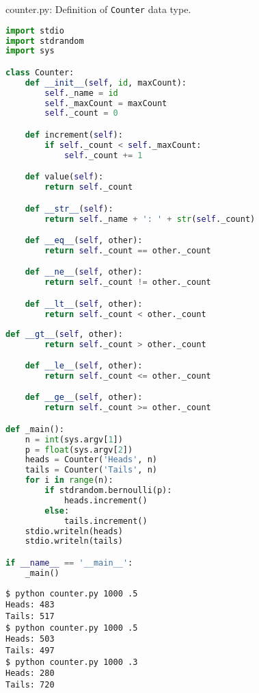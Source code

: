 \documentclass[8pt,a4paper,compress]{beamer}
\begin{document}
\begin{frame}[fragile]
\pause

\begin{framed}
\tiny counter.py: Definition of \lstinline{Counter} data type.
\end{framed}

\begin{lstlisting}[language=Python]
import stdio
import stdrandom
import sys

class Counter:
    def __init__(self, id, maxCount):
        self._name = id
        self._maxCount = maxCount
        self._count = 0

    def increment(self):
        if self._count < self._maxCount:
            self._count += 1

    def value(self):
        return self._count

    def __str__(self):
        return self._name + ': ' + str(self._count)

    def __eq__(self, other):
        return self._count == other._count

    def __ne__(self, other):
        return self._count != other._count

    def __lt__(self, other):
        return self._count < other._count
\end{lstlisting}
\end{frame}

\begin{frame}[fragile]
\pause

\begin{lstlisting}[language=Python]
    def __gt__(self, other):
        return self._count > other._count

    def __le__(self, other):
        return self._count <= other._count

    def __ge__(self, other):
        return self._count >= other._count

def _main():
    n = int(sys.argv[1])
    p = float(sys.argv[2])
    heads = Counter('Heads', n)
    tails = Counter('Tails', n)
    for i in range(n):
        if stdrandom.bernoulli(p):
            heads.increment()
        else:
            tails.increment()
    stdio.writeln(heads)
    stdio.writeln(tails)

if __name__ == '__main__':
    _main()
\end{lstlisting}

\pause

\begin{lstlisting}[language={}]
$ python counter.py 1000 .5
Heads: 483
Tails: 517
$ python counter.py 1000 .5
Heads: 503
Tails: 497
$ python counter.py 1000 .3
Heads: 280
Tails: 720
\end{lstlisting}
\end{frame}
\end{document}
